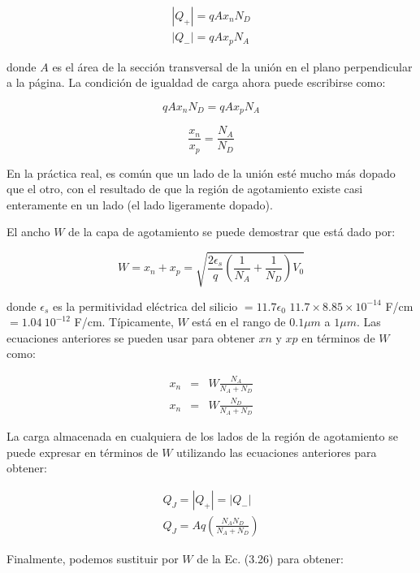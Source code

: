 \begin{eqnarray*}
|Q_+| = q A x_n N_D \\
|Q_-| = q A x_p N_A 
\end{eqnarray*}

donde \(A\) es el área de la sección transversal de la unión en el plano perpendicular a la página. La condición de igualdad de carga ahora puede escribirse como:

\begin{equation*}
q A x_n N_D = q A x_p N_A
\end{equation*}

\begin{equation*}
\frac{x_n}{x_p} = \frac{N_A}{N_D}
\end{equation*}

En la práctica real, es común que un lado de la unión esté mucho más dopado que el otro, con el resultado de que la región de agotamiento existe casi enteramente en un lado (el lado ligeramente dopado).

El ancho \(W\) de la capa de agotamiento se puede demostrar que está dado por:

\begin{equation}
W = x_n + x_p = \sqrt{\frac{2 \epsilon_s}{q}\left( \frac{1}{N_A} + \frac{1}{N_D} \right) V_0}
\label{eq_anchoZonaDeplexion}
\end{equation}

donde \( \epsilon_s \) es la permitividad eléctrica del silicio \( = 11.7 \epsilon_0 \)
\( 11.7 \times 8.85 \times 10^{-14} \) F/cm \( = 1.04 \ 10^{-12} \) F/cm. Típicamente, \( W \) está en el rango de $0.1 \mu m$ a $1 \mu m$. Las ecuaciones anteriores se pueden usar para obtener \( xn \) y \( xp \) en términos de \( W \) como:

\begin{eqnarray*}
x_n &=& W \frac{N_A}{N_A + N_D} \\
x_n &=& W \frac{N_D}{N_A + N_D}
\end{eqnarray*}

La carga almacenada en cualquiera de los lados de la región de agotamiento se puede expresar en términos de \( W \) utilizando las ecuaciones anteriores para obtener:

\begin{eqnarray*}
Q_J = |Q_+| = |Q_-| \\
Q_J = A q \left( \frac{N_A N_D}{N_A + N_D} \right)
\end{eqnarray*}

Finalmente, podemos sustituir por \( W \) de la Ec. (3.26) para obtener:


